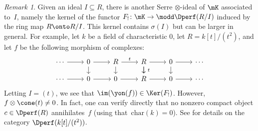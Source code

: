 \documentclass[11pt]{amsart}
\numberwithin{equation}{section} %
\theoremstyle{plain}
\theoremstyle{definition}
\theoremstyle{remark}
\newtheorem{rem}[equation]{Remark}
\begin{document}
\begin{rem}
Given an ideal $I \subseteq R$, there is another Serre $\otimes$-ideal of $\mK$ associated to~$I$, namely the kernel of the functor $F_! \colon \mK \to \modd \Dperf(R / I)$ induced by the ring map $R \onto R / I$. This kernel contains $\sigma(I)$ but can be larger in general. For example, let $k$ be a field of characteristic $0$, let $R = k[t] / (t^2)$, and let $f$ be the following morphism of complexes:
\[\begin{tikzcd}[row sep=1em]
    \cdots & 0 & R & R & 0 & \cdots \\
    \cdots & 0 & 0 & R & 0 & \cdots
    \arrow[from=1-1, to=1-2]
    \arrow[from=1-2, to=1-3]
    \arrow["t", from=1-3, to=1-4]
    \arrow[from=1-4, to=1-5]
    \arrow[from=1-5, to=1-6]
    \arrow[from=2-1, to=2-2]
    \arrow[from=2-2, to=2-3]
    \arrow[from=2-3, to=2-4]
    \arrow[from=2-4, to=2-5]
    \arrow[from=2-5, to=2-6]
    \arrow[from=1-2, to=2-2]
    \arrow[from=1-3, to=2-3]
    \arrow[from=1-4, to=2-4]
    \arrow["\ t", from=1-4, to=2-4]
    \arrow[from=1-5, to=2-5]
\end{tikzcd}\]
Letting $I = (t)$, we see that $\im(\yon(f)) \in \Ker(F_!)$. However, $f \otimes \cone(t) \neq 0$. In fact, one can verify directly that no nonzero compact object $c \in \Dperf(R)$ annihilates~$f$ (using that~$\textrm{char}(k)=0$). See \cite{AmodeoMoschetti15} for details on the category $\Dperf(k[t] / (t^2))$.
\end{rem}


% 
% 
\end{document}
